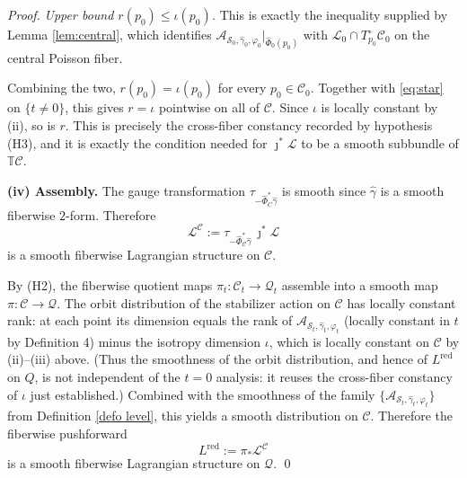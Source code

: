 \documentclass[reqno]{amsart}
\theoremstyle{plain}
\theoremstyle{definition}
\newcommand{\Lred}{L^{\mathrm{red}}}
\newcommand{\C}{\mathcal{C}}
\renewcommand{\S}{\mathcal{S}}
\renewcommand{\L}{\mathcal{L}}
\newcommand{\jmapb}{\jmath}
\newcommand{\Phib}{\widehat{\Phi}}
\newcommand{\gammab}{\widehat{\gamma}}
\newcommand{\A}{\mathcal{A}}
\newcommand{\Q}{\mathcal{Q}}
\begin{document}
\begin{proof}
\emph{Upper bound $r(p_0)\le\iota(p_0)$.} This is exactly the inequality supplied by Lemma \ref{lem:central}, which identifies $\A_{\S_0,\gammab_0,\varphi_0}|_{\Phib_0(p_0)}$
with $\L_0\cap T^{\circ}_{p_0}\C_0$ on the central Poisson fiber.
 
Combining the two, $r(p_0)=\iota(p_0)$ for every $p_0\in \C_0$. Together with \eqref{eq:star} on $\{t\neq0\}$, this gives $r=\iota$ pointwise on all of $\C$.
Since $\iota$ is locally constant by (ii), so is $r$. This is precisely the cross-fiber constancy recorded by hypothesis (H3), and it is exactly the condition needed for $\jmapb^{\ast}\L$ to be a smooth subbundle of $\mathbb{T}\C$.
 
\medskip
\noindent\textbf{(iv) Assembly.}
The gauge transformation $\tau_{-\Phib_C^\ast\gammab}$ is smooth since $\gammab$ is a
smooth fiberwise $2$-form. Therefore
\[
  \L^{\C}:=\tau_{-\Phib_\C^\ast\gammab}\,\jmapb^{\ast}\L
\]
is a smooth fiberwise Lagrangian structure on $\C$.
 
By (H2), the fiberwise quotient maps $\pi_t: \C_t \to \Q_t$ assemble into a smooth map $\pi\colon \C \to \Q$. The orbit distribution of the stabilizer action on $\C$ has
locally constant rank: at each point its dimension equals the rank of $\A_{\S_t,\gammab_t,\varphi_t}$ (locally constant in $t$ by Definition 4) minus the isotropy dimension $\iota$, which is locally constant on $\C$ by (ii)--(iii) above.
(Thus the smoothness of the orbit distribution, and hence of $\Lred$ on $Q$, is not
independent of the $t=0$ analysis: it reuses the cross-fiber constancy of $\iota$
just established.) Combined with the smoothness of the family
$\{\A_{\S_t,\gammab_t,\varphi_t}\}$ from Definition \ref{defo level}, this yields a smooth distribution on $\C$. Therefore the fiberwise pushforward
\[
  \Lred:=\pi_\ast \L^{\C}
\]
is a smooth fiberwise Lagrangian structure on $\Q$. \qed


\end{proof}
\end{document}
